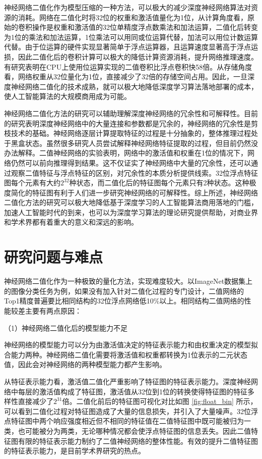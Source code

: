 神经网络二值化作为模型压缩的一种方法，可以极大的减少深度神经网络算法对资源的消耗。网络在二值化时将32位的权重和激活值量化为1位，从计算角度看，原始的卷积操作是权重和激活值的32位单精度浮点数乘法和加法运算，二值化后转变为1位的乘法和加法运算，1位乘法可以用同或位运算代替，加法可以用位计数运算代替。由于位运算的硬件实现显著简单于浮点运算器，且运算速度显著高于浮点运损，因此二值化后的卷积计算可以极大的降低计算资源消耗，提升网络推理速度。有研究表明在CPU上使用位运算实现的二值卷积比浮点卷积快58倍\citep{xnornet}。从存储角度看，网络权重从32位量化为1位，直接减少了32倍的存储空间占用。因此，一旦深度神经网络二值化的技术成熟，就可以极大地降低深度学习算法落地部署的成本，使人工智能算法的大规模商用成为可能。

神经网络二值化方法的研究可以辅助理解深度神经网络的冗余性和可解释性。目前的研究表明深度神经网络中的大量连接和参数都是冗余的，神经网络的冗余性是剪枝技术的基础。神经网络逐层计算提取特征的过程是十分抽象的，整体推理过程处于黑盒状态。虽然很多研究人员尝试解释神经网络特征提取的过程，但目前仍然没办法解释。二值神经网络的实验表明，网络中的激活值和权重在1位的情况下，网络仍然可以前向推理得到结果。这不仅证实了神经网络中大量的冗余性，还可以通过观察二值特征与浮点特征的区别，对冗余性的本质分析提供线索。32位浮点特征图每个元素有大约$2^{32}$种状态，而二值化后的特征图每个元素只有2种状态。这种极度简化的特征图有利于人们进一步研究神经网络的可解释性。综上所述，神经网络二值化方法的研究可以极大地降低基于深度学习的人工智能算法商用落地的门槛，加速人工智能时代的到来，也可以为深度学习算法的理论研究提供帮助，对商业界和学术界都有着重大的意义和深远的影响。

\section{研究问题与难点}

神经网络二值化作为一种极致的量化方法，实现难度较大。以ImageNet数据集上的图像分类任务为例，如果没有加入针对二值化过程的专门设计，二值网络的Top1精度普遍要比相同结构的32位浮点网络低10\%以上。相同结构二值网络的性能较差主要有两点原因：

（1）神经网络二值化后的模型能力不足

神经网络的模型能力可以分为由激活值决定的特征表示能力和由权重决定的模型拟合能力两种。神经网络二值化需要将激活值和权重都转换为1位表示的二元状态值，因此会对神经网络的两种模型能力都产生影响。

从特征表示能力看，激活值二值化严重影响了特征图的特征表示能力。深度神经网络中每层的激活值构成了特征图，激活值从32位到1位的转换使得特征图的特征多样性直接减少了$2^{31}$倍。二值化前后的特征图可视化对比如图 \ref{fig:float_bin} 所示，可以看到二值化过程对特征图造成了大量的信息损失，并引入了大量噪声。32位浮点特征图中两个响应强度相近但不相同的特征值在二值特征图中既可能被归为一类，也可能被分为两类，无论哪种情况都会使浮点特征图的信息丢失。因此二值特征图有限的特征表示能力制约了二值神经网络的整体性能。有效的提升二值特征图的特征表示能力，是目前学术界研究的热点。

